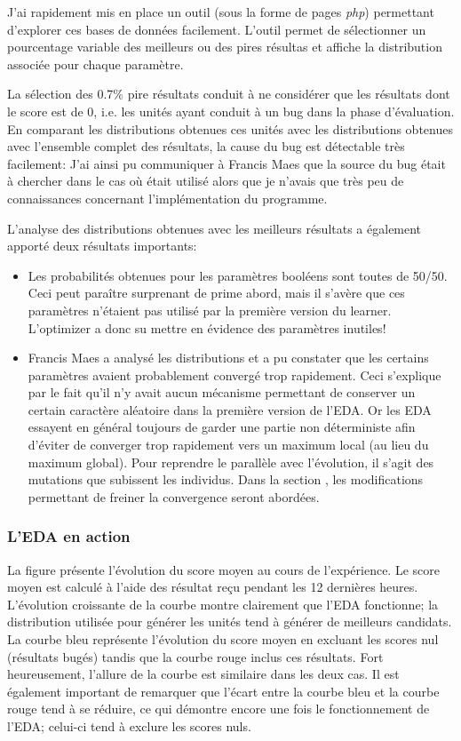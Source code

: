 \documentclass[a4paper, 11pt]{article}
\begin{document}
J'ai rapidement mis en place un outil (sous la forme de pages \textit{php}) permettant d'explorer ces bases de données facilement. %
L'outil permet de sélectionner un pourcentage variable des meilleurs ou des pires résultas et affiche la distribution associée pour chaque paramètre.

La sélection des 0.7\% pire résultats conduit à ne considérer que les résultats dont le score est de 0, i.e. les unités ayant conduit à un bug dans la phase d'évaluation. En comparant les distributions obtenues ces unités avec les distributions obtenues avec l'ensemble complet des résultats, la cause du bug est détectable très facilement:
J'ai ainsi pu communiquer à Francis Maes que la source du bug était à chercher dans le cas où %
était utilisé alors que je n'avais que très peu de connaissances concernant l'implémentation du programme.

L'analyse des distributions obtenues avec les meilleurs résultats a également apporté deux résultats importants:
\begin{itemize}
\item Les probabilités obtenues pour les paramètres booléens sont toutes de 50/50. Ceci peut paraître surprenant de prime abord, mais il s'avère que ces paramètres n'étaient pas utilisé par la première version du learner. L'optimizer a donc su mettre en évidence des paramètres inutiles!
\item Francis Maes a analysé les distributions et a pu constater que les certains paramètres avaient probablement convergé trop rapidement. Ceci s'explique par le fait qu'il n'y avait aucun mécanisme permettant de conserver un certain caractère aléatoire dans la première version de l'EDA. Or les EDA essayent en général toujours de garder une partie non déterministe afin d'éviter de converger trop rapidement vers un maximum local (au lieu du maximum global). Pour reprendre le parallèle avec l'évolution, il s'agit des mutations que subissent les individus. Dans la section %
, les modifications permettant de freiner la convergence seront abordées.
\end{itemize}


\subsubsection{L'EDA en action}
La figure %
présente l'évolution du score moyen au cours de l'expérience. Le score moyen est calculé à l'aide des résultat reçu pendant les 12 dernières heures. L'évolution croissante de la courbe montre clairement que l'EDA fonctionne; la distribution utilisée pour générer les unités tend à générer de meilleurs candidats. La courbe bleu représente l'évolution du score moyen en excluant les scores nul (résultats bugés) tandis que la courbe rouge inclus ces résultats. Fort heureusement, l'allure de la courbe est similaire dans les deux cas. Il est également important de remarquer que l'écart entre la courbe bleu et la courbe rouge tend à se réduire, ce qui démontre encore une fois le fonctionnement de l'EDA; celui-ci tend à exclure les scores nuls.
\end{document}
